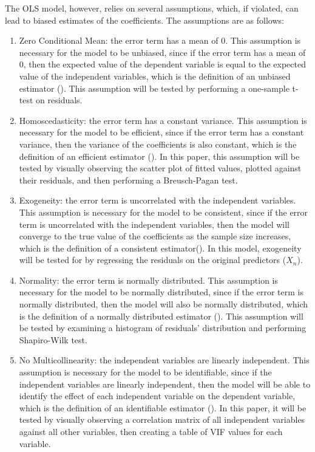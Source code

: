 \documentclass[12pt]{report}
\begin{document}
The OLS model, however, relies on several assumptions, which, if violated, can lead to biased estimates of the coefficients. The assumptions are as follows:
\begin{enumerate}
	\item Zero Conditional Mean: the error term has a mean of 0. This assumption is necessary for the model to be unbiased, since if the error term has a mean of 0, then the expected value of the dependent variable is equal to the expected value of the independent variables, which is the definition of an unbiased estimator (\cite{Crudu2022}). This assumption will be tested by performing a one-sample t-test on residuals.
	\item Homoscedasticity: the error term has a constant variance. This assumption is necessary for the model to be efficient, since if the error term has a constant variance, then the variance of the coefficients is also constant, which is the definition of an efficient estimator (\cite{Yang2019}). In this paper, this assumption will be tested by visually observing the scatter plot of fitted values, plotted against their residuals, and then performing a Breusch-Pagan test.
	\item Exogeneity: the error term is uncorrelated with the independent variables. This assumption is necessary for the model to be consistent, since if the error term is uncorrelated with the independent variables, then the model will converge to the true value of the coefficients as the sample size increases, which is the definition of a consistent estimator(\cite[p. 95]{Baltagi2011}). In this model, exogeneity will be tested for by regressing the residuals on the original predictors ($X_n$).
	\item Normality: the error term is normally distributed. This assumption is necessary for the model to be normally distributed, since if the error term is normally distributed, then the model will also be normally distributed, which is the definition of a normally distributed estimator (\cite{schmidt2018}). This assumption will be tested by examining a histogram of residuals' distribution and performing Shapiro-Wilk test.
	\item No Multicollinearity: the independent variables are linearly independent. This assumption is necessary for the model to be identifiable, since if the independent variables are linearly independent, then the model will be able to identify the effect of each independent variable on the dependent variable, which is the definition of an identifiable estimator (\cite{shrestha2020}). In this paper, it will be tested by visually observing a correlation matrix of all independent variables against all other variables, then creating a table of VIF values for each variable.
\end{enumerate}
\end{document}

